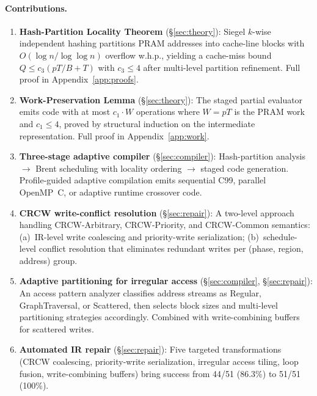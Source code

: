 \documentclass[11pt]{article}
\begin{document}
\paragraph{Contributions.}
\begin{enumerate}[leftmargin=*]
\item \textbf{Hash-Partition Locality Theorem}
  (\S\ref{sec:theory}): Siegel $k$-wise independent hashing partitions
  PRAM addresses into cache-line blocks with $O(\log n / \log\log n)$
  overflow w.h.p., yielding a cache-miss bound $Q \le c_3(pT/B + T)$
  with $c_3 \le 4$ after multi-level partition refinement.  Full proof in
  Appendix~\ref{app:proofs}.

\item \textbf{Work-Preservation Lemma} (\S\ref{sec:theory}): The
  staged partial evaluator emits code with at most $c_1 \cdot W$
  operations where $W = pT$ is the PRAM work and $c_1 \le 4$, proved
  by structural induction on the intermediate representation.  Full
  proof in Appendix~\ref{app:work}.

\item \textbf{Three-stage adaptive compiler} (\S\ref{sec:compiler}):
  Hash-partition analysis $\to$ Brent scheduling with locality
  ordering $\to$ staged code generation.  Profile-guided adaptive
  compilation emits sequential C99, parallel OpenMP~C, or adaptive
  runtime crossover code.

\item \textbf{CRCW write-conflict resolution} (\S\ref{sec:repair}):
  A two-level approach handling CRCW-Arbitrary, CRCW-Priority, and
  CRCW-Common semantics: (a)~IR-level write coalescing and
  priority-write serialization; (b)~schedule-level conflict resolution
  that eliminates redundant writes per (phase, region, address) group.

\item \textbf{Adaptive partitioning for irregular access}
  (\S\ref{sec:compiler}, \S\ref{sec:repair}): An access pattern analyzer
  classifies address streams as Regular, GraphTraversal, or Scattered,
  then selects block sizes and multi-level partitioning strategies
  accordingly.  Combined with write-combining buffers for scattered
  writes.

\item \textbf{Automated IR repair} (\S\ref{sec:repair}): Five
  targeted transformations (CRCW coalescing, priority-write
  serialization, irregular access tiling, loop fusion, write-combining
  buffers) bring success from 44/51 (86.3\%) to 51/51 (100\%).


\end{enumerate}
\end{document}
